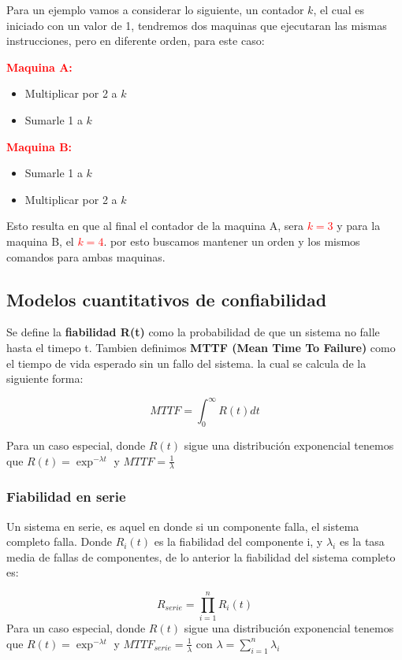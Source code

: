 Para un ejemplo vamos a considerar lo siguiente, un contador $k$, el cual es iniciado con un valor de 1, tendremos dos maquinas que ejecutaran las mismas instrucciones, pero en diferente orden, para este caso:

\textcolor{red}{\textbf{Maquina A:}}
\begin{itemize}
    \item Multiplicar por 2 a $k$
    \item Sumarle 1 a $k$
\end{itemize}
\textcolor{red}{\textbf{Maquina B:}}
\begin{itemize}
    \item Sumarle 1 a $k$
    \item Multiplicar por 2 a $k$
\end{itemize}
\vspace{1mm}

Esto resulta en que al final el contador de la maquina A, sera \textcolor{red}{$k=3$} y para la maquina B, el \textcolor{red}{$k=4$}. por esto buscamos mantener un orden y los mismos comandos para ambas maquinas.

\subsection{Modelos cuantitativos de confiabilidad}
Se define la \textbf{fiabilidad R(t)} como la probabilidad de que un sistema no falle hasta el timepo t. Tambien definimos \textbf{MTTF (Mean Time To Failure)} como el tiempo de vida esperado sin un fallo del sistema. la cual se calcula de la siguiente forma:

\[
    MTTF= \int_{0}^{\infty}R(t)dt
\]

Para un caso especial, donde $R(t)$ sigue una distribución exponencial tenemos que $R(t)=\exp^{-\lambda t}$ y $MTTF= \frac{1}{\lambda}$

\subsubsection{Fiabilidad en serie}
Un sistema en serie, es aquel en donde si un componente falla, el sistema completo falla. Donde $R_i(t)$ es la fiabilidad del componente i, y $\lambda_i$ es la tasa media de fallas de componentes, de lo anterior la fiabilidad del sistema completo es:

\[
    R_{serie}=\prod_{i=1}^{n} R_i(t)
\]
Para un caso especial, donde $R(t)$ sigue una distribución exponencial tenemos que $R(t)=\exp^{-\lambda t}$ y $MTTF_{serie}= \frac{1}{\lambda}$ con $\lambda= \sum_{i=1}^{n}\lambda_i $ 

